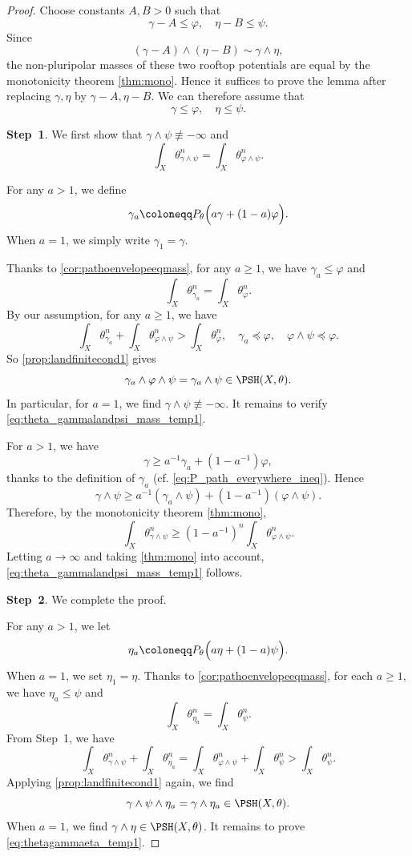 \begin{proof}
    Choose constants $A,B>0$ such that
    \[
        \gamma-A\leq \varphi,\quad \eta-B\leq \psi.
    \]
    Since
    \[
        (\gamma-A)\land(\eta-B)\sim \gamma\land\eta,
    \]
    the non-pluripolar masses of these two rooftop potentials are equal by the monotonicity theorem \cref{thm:mono}. Hence it suffices to prove the lemma after replacing $\gamma,\eta$ by $\gamma-A,\eta-B$. We can therefore assume that
    \[
        \gamma\leq \varphi,\quad \eta\leq \psi.
    \]

    \textbf{Step~1}. We first show that $\gamma\land \psi\not\equiv -\infty$ and
    \begin{equation}\label{eq:theta_gammalandpsi_mass_temp1}
    \int_X \theta_{\gamma\land \psi}^n=\int_X \theta_{\varphi\land \psi}^n.
    \end{equation}

    For any $a>1$, we define
    \[
    \gamma_a\coloneqq P_{\theta}\Bigl( a\gamma+(1-a)\varphi \Bigr).
    \]
    When $a=1$, we simply write $\gamma_1=\gamma$.

    Thanks to \cref{cor:pathoenvelopeeqmass}, for any $a\geq 1$, we have $\gamma_a\leq \varphi$ and
    \[
    \int_X \theta_{\gamma_a}^n=\int_X \theta_{\varphi}^n.
    \]
    By our assumption, for any $a\geq 1$, we have
    \[
    \int_X \theta_{\gamma_a}^n+\int_X \theta_{\varphi\land \psi}^n> \int_X \theta_{\varphi}^n,\quad \gamma_a\preceq \varphi,\quad \varphi\land \psi\preceq \varphi.
    \]
    So \cref{prop:landfinitecond1} gives
    \[
    \gamma_a\land \varphi\land \psi=\gamma_a\land \psi\in \PSH(X,\theta).
    \]
    In particular, for $a=1$, we find $\gamma\land \psi\not\equiv -\infty$. It remains to verify \eqref{eq:theta_gammalandpsi_mass_temp1}.

    For $a>1$, we have
    \[
    \gamma\geq a^{-1}\gamma_a+\left(1-a^{-1}\right)\varphi,
    \]
    thanks to the definition of $\gamma_a$ (cf. \eqref{eq:P_path_everywhere_ineq}). Hence
    \[
    \gamma\land \psi\geq a^{-1}\left( \gamma_a\land \psi\right)+\left(1-a^{-1}\right)\left(\varphi\land \psi\right).
    \]
    Therefore, by the monotonicity theorem \cref{thm:mono},
    \[
    \int_X \theta_{\gamma\land \psi}^n\geq \left(1-a^{-1}\right)^n \int_X \theta_{\varphi\land \psi}^n.
    \]
    Letting $a\to \infty$ and taking \cref{thm:mono} into account, \eqref{eq:theta_gammalandpsi_mass_temp1} follows.

    \textbf{Step~2}. We complete the proof.

    For any $a>1$, we let
    \[
    \eta_a\coloneqq P_{\theta}\Bigl( a\eta+(1-a)\psi \Bigr).
    \]
    When $a=1$, we set $\eta_1=\eta$.
    Thanks to \cref{cor:pathoenvelopeeqmass}, for each $a\geq 1$, we have $\eta_a\leq \psi$ and
    \[
    \int_X \theta_{\eta_a}^n=\int_X \theta_{\psi}^n.
    \]
    From Step~1, we have
    \[
    \int_X \theta_{\gamma\land\psi}^n+\int_X \theta_{\eta_a}^n=\int_X \theta_{\varphi\land \psi}^n+\int_X \theta_{\psi}^n>\int_X \theta_{\psi}^n.
    \]
    Applying \cref{prop:landfinitecond1} again, we find
    \[
    \gamma\land\psi\land \eta_a =\gamma\land \eta_a\in \PSH(X,\theta).
    \]
    When $a=1$, we find $\gamma\land \eta\in \PSH(X,\theta)$. It remains to prove \eqref{eq:thetagammaeta_temp1}.


\end{proof}
